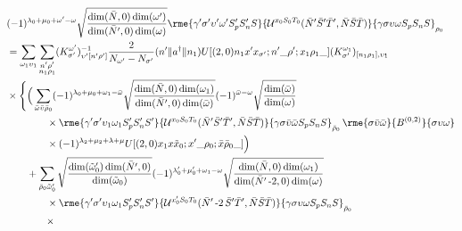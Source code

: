 \documentclass[%
  aps,%
  prc,%
  showpacs,%
  superscriptaddress,%
  onecolumn,%
  notitlepage,%
  11pt,%
  floatfix,%
  amsmath,%
  amssymb,%
]{revtex4-2}
\newcommand{\negative}{\,\text{-}}
\begin{document}
\begin{align*}
  &(-1)^{\lambda_0+\mu_0+\omega'-\omega} \sqrt{\frac{\dim(\bar{N},0)\dim(\omega')}{\dim(\bar{N}',0)\dim(\omega)}}
  \rme{\gamma'\sigma'\upsilon'\omega'S_p'S_n'S}{\mathcal{U}^{x_0 S_0 T_0}(\bar{N}'\bar{S}'\bar{T}',\bar{N}\bar{S}\bar{T})}{\gamma\sigma\upsilon\omega S_p S_n S}_{\rho_0}\\
  &=\sum_{\omega_1\upsilon_1} \sum_{\substack{n'\rho'\\n_1\rho_1}}(K_{\sigma'}^{\omega'})_{\upsilon'[n'\rho']}^{-1}\frac{2}{N_{\omega'} - N_{\sigma'}}(n'\Vert{}a^\dagger\Vert{}n_1) U[(2,0)n_1 x' x_{\sigma'};n'\_\rho';x_1\rho_1\_](K_{\sigma'}^{\omega_1})_{[n_1\rho_1],\upsilon_1}\\
  &\times\Bigg\{\Big(\sum_{\bar{\omega}\bar{\upsilon}\bar{\rho}_0}
      (-1)^{\lambda_0+\mu_0+\omega_1-\bar{\omega}}
      \sqrt{\frac{\dim(\bar{N},0)\dim(\omega_1)}{\dim(\bar{N}',0)\dim(\bar{\omega})}}
      (-1)^{\bar{\omega}-\omega}
      \sqrt{\frac{\dim(\bar{\omega})}{\dim(\omega)}}
      \\
      & \qquad \qquad \times
      \rme{\gamma'\sigma'\upsilon_1\omega_1 S_p' S_n' S'}{\mathcal{U}^{x_0S_0T_0}(\bar{N}'\bar{S}'\bar{T}',\bar{N}\bar{S}\bar{T})}{\gamma \sigma \bar{\upsilon}\bar{\omega} S_p S_n S}_{\bar{\rho}_0} \, \rme{\sigma \bar{\upsilon}\bar{\omega}}{B^{(0,2)}}{\sigma \upsilon \omega}\\
  &\qquad\qquad\times
      (-1)^{\lambda_2+\mu_2+\lambda+\mu} U[(2,0) x_1 x \tilde{x}_0; x' \_ \rho_0; \bar{x}\bar{\rho}_0\_]
    \Big)\\
  &\qquad+\sum_{\bar{\rho}_0\tilde{\omega}_0'}
  \sqrt{\frac{\dim(\tilde{\omega}_0')\dim(\bar{N}',0)}{\dim(\tilde{\omega}_0)}}
  (-1)^{\lambda_0'+\mu_0'+\omega_1-\omega} \sqrt{\frac{\dim(\bar{N},0)\dim(\omega_1)}{\dim(\bar{N}'\negative2,0)\dim(\omega)}} \\
  & \qquad \qquad \times
  \rme{\gamma'\sigma'\upsilon_1\omega_1 S_p' S_n' S'}{\mathcal{U}^{x_0'S_0T_0}(\bar{N}'\negative2\,\bar{S}'\bar{T}',\bar{N}\bar{S}\bar{T})}{\gamma \sigma \upsilon \omega S_p S_n S}_{\bar{\rho}_0}\\
  &\qquad\qquad\times

\end{align*}
\end{document}
